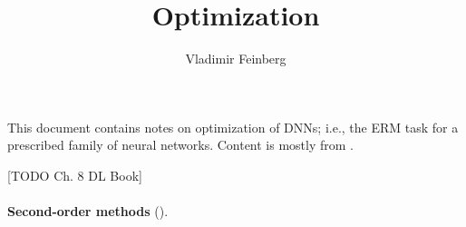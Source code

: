 \documentclass{article}
\title{Optimization}
\author{Vladimir Feinberg}
\begin{document}
\maketitle

This document contains notes on optimization of DNNs; i.e., the ERM task for a prescribed family of neural networks. Content is mostly from .

[TODO Ch. 8 DL Book]
\\\\
\noindent
\textbf{Second-order methods} ().
\end{document}
